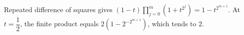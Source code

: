 Repeated difference of squares gives $(1-t)\prod_{j=0}^{m}(1+t^{2^j})=1-t^{2^{m+1}}$. At $t=\dfrac{1}{2}$, the finite product equals $2(1-2^{-2^{m+1}})$, which tends to $\boxed2$.
